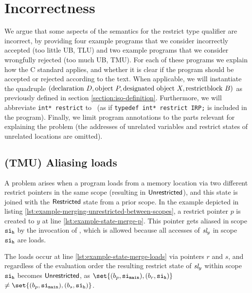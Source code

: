 \newpage

\section{Incorrectness}\label{sec:cink-incorrect}
We argue that some aspects of the \cink{} semantics for the restrict type qualifier are incorrect, by providing four example programs
that we consider incorrectly accepted (too little UB, TLU) and two example programs that we consider wrongfully rejected (too much UB, TMU).
For each of these programs we explain how the C standard applies, and whether it is clear if the program should be accepted or rejected
according to the text. When applicable, we will instantiate the quadruple $(\text{declaration } D, \text{object } P, \text{designated object } X, \text{restrict} \\ \text{block } B)$
as previously defined in section \ref{section:iso-definition}.
Furthermore, we will abbreviate \texttt{int* restrict} to \irp \ (as if \texttt{typedef int* restrict IRP;} is included in the program).
Finally, we limit program annotations to the parts relevant for explaining the problem (\eg the addresses of unrelated variables
and restrict states of unrelated locations are omitted).

\subsection{(TMU) Aliasing loads}\label{subsec:aliasing-reads} %
A problem arises when a program loads from a memory location via two different restrict pointers in the same scope
(resulting in $\mathsf{Unrestricted}$), and this state is joined with the $\mathsf{Restricted}$ state from a prior scope.
In the example depicted in listing \ref{lst:example-merging-unrestricted-between-scopes}, a restrict pointer $p$ is created to $y$ at line \ref{lst:example-state-merge-p}.
This pointer gets aliased in scope $\mathtt{si}_\mathtt{h}$ by the invocation of , which is allowed because all accesses of $\textit{sl}_y$ in scope $\mathtt{si}_\mathtt{h}$ are loads.

The loads occur at line \ref{lst:example-state-merge-loads} via pointers $r$ and $s$, and regardless of the evaluation order the resulting
restrict state of $\textit{sl}_y$ within scope $\mathtt{si}_\mathtt{h}$ becomes $\mathsf{Unrestricted}$, as
$\set{(b_p, \scope{main}), (b_r, \scope{h})}$ $\neq \set{(b_p, \scope{main}), (b_s, \scope{h})}$. 

